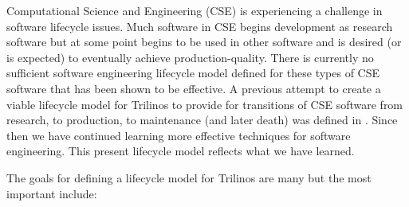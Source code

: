 \documentclass[11pt]{SANDreport}
\begin{document}
\begin{figure}
\begin{center}
\end{center}
\end{figure}

Computational Science and Engineering (CSE) is experiencing a
challenge in software lifecycle issues.  Much software in CSE begins
development as research software but at some point begins to be used
in other software and is desired (or is expected) to eventually
achieve production-quality.  There is currently no sufficient software
engineering lifecycle model defined for these types of CSE software
that has been shown to be effective.  A previous attempt to create a
viable lifecycle model for Trilinos to provide for transitions of CSE
software from research, to production, to maintenance (and later
death) was defined in {}\cite{TrilinosLifecycleModel2007}.  Since then we
have continued learning more effective techniques for software engineering.
This present lifecycle model reflects what we have learned.

The goals for defining a lifecycle model for Trilinos are many but the
most important include:
\end{document}
